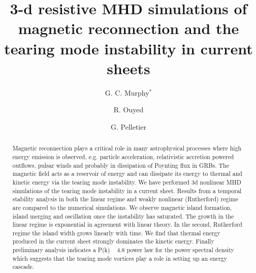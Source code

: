 \documentclass[square]{ws-procs11x85}
\begin{document}
\title{3-d resistive MHD simulations of magnetic reconnection and the tearing mode instability in current sheets}

\author{G. C. Murphy$^*$}

\address{Laboratoire d'Astrophysique de Grenoble, CNRS, Universit\'e Joseph Fourier, Grenoble, France\\
$^*$E-mail: Gareth.Murphy@obs.ujf-grenoble.fr}

\author{R. Ouyed}

\address{ Department of Physics and Astronomy, University of Calgary,AB, Canada\\
E-mail: ouyed@phas.ucalgary.ca}

\author{G. Pelletier}

\address{Laboratoire d'Astrophysique de Grenoble, CNRS, Universit\'e Joseph Fourier, Grenoble, France\\
E-mail: Guy.Pelletier@obs.ujf-grenoble.fr}

\begin{abstract}
Magnetic reconnection plays a critical role in many astrophysical processes
where high energy emission is observed, e.g. particle
acceleration, relativistic accretion powered outflows, pulsar winds and probably
in dissipation of Poynting flux in GRBs. The magnetic field
acts as a reservoir of energy and can dissipate its energy to thermal and
kinetic energy via the tearing mode instability. We have performed 3d
nonlinear
MHD simulations of the tearing mode instability in a current sheet. Results from
a temporal stability analysis in both the linear
regime and weakly nonlinear
(Rutherford) regime are compared to the numerical simulations. We observe
magnetic island formation, island
merging and oscillation once the instability has saturated. The growth in the
linear regime is exponential in agreement with linear theory. In
the second, Rutherford regime the island width grows linearly with time. We find
that thermal energy produced in the current sheet strongly
dominates the kinetic energy. Finally preliminary analysis indicates a P(k) ~
4.8
power law for the power spectral density which suggests that
the tearing mode vortices play a role in setting up an energy cascade.
\end{abstract}


\bodymatter
\end{document}
